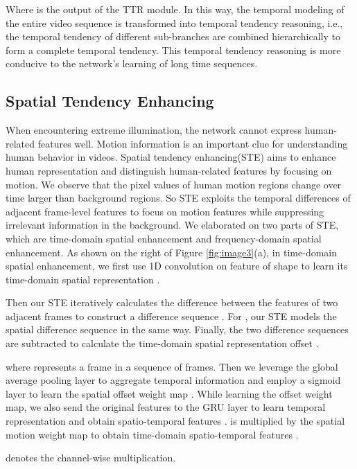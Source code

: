 \documentclass{bmvc2k}
\begin{document}
Where  is the output of the TTR module.
In this way, the temporal modeling of the entire video sequence is transformed into temporal tendency reasoning, i.e., the temporal tendency of different sub-branches are combined hierarchically to form a complete temporal tendency. This temporal tendency reasoning is more conducive to the network's learning of long time sequences.


\subsection{Spatial Tendency Enhancing}
When encountering extreme illumination, the network cannot express human-related features well. Motion information is an important clue for understanding human behavior in videos. 
Spatial tendency enhancing(STE) aims to enhance human representation and distinguish human-related features by focusing on motion. We observe that the pixel values of human motion regions change over time larger than background regions. So STE exploits the temporal differences of adjacent frame-level features to focus on motion features while suppressing irrelevant information in the background.
We elaborated on two parts of STE, which are time-domain spatial enhancement and frequency-domain spatial enhancement.
As shown on the right of Figure \ref{fig:image3}(a), in time-domain spatial enhancement, we first use 1D convolution on feature  of shape  to learn its time-domain spatial representation . 

Then our STE iteratively calculates the difference between the features of two adjacent frames to construct a difference sequence . For , our STE models the spatial difference sequence  in the same way. Finally, the two difference sequences are subtracted to calculate the time-domain spatial representation offset .

where  represents a frame in a sequence of  frames. Then we leverage the global average pooling layer to aggregate temporal information and employ a sigmoid layer to learn the spatial offset weight map . 
While learning the offset weight map, we also send the original features to the GRU \cite{dey2017gate} layer to learn temporal representation and obtain spatio-temporal features .  is multiplied by the spatial motion weight map  to obtain time-domain spatio-temporal features .

 denotes the channel-wise multiplication. 
\end{document}
